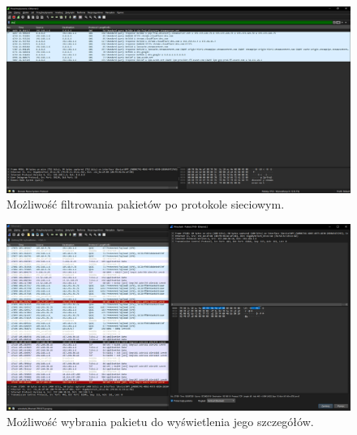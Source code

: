 \documentclass[0.82pt,a4paper]{article}
\begin{document}
    \begin{figure}[H]
        \centering
        \includegraphics[width=0.8\linewidth]{media/Wireshark/wireshark2_dns.PNG}
        \caption[wireshark filtr]{Możliwość filtrowania pakietów po protokole sieciowym.}
        \label{fig:wireshark_dns}
    \end{figure}

    \begin{figure}[H]
        \centering
        \includegraphics[width=0.8\linewidth]{media/Wireshark/wireshark3.PNG}
        \caption[wireshark szczegoly]{Możliwość wybrania pakietu do wyświetlenia jego szczegółów.}
        \label{fig:wireshark_klik}
    \end{figure}
\end{document}
